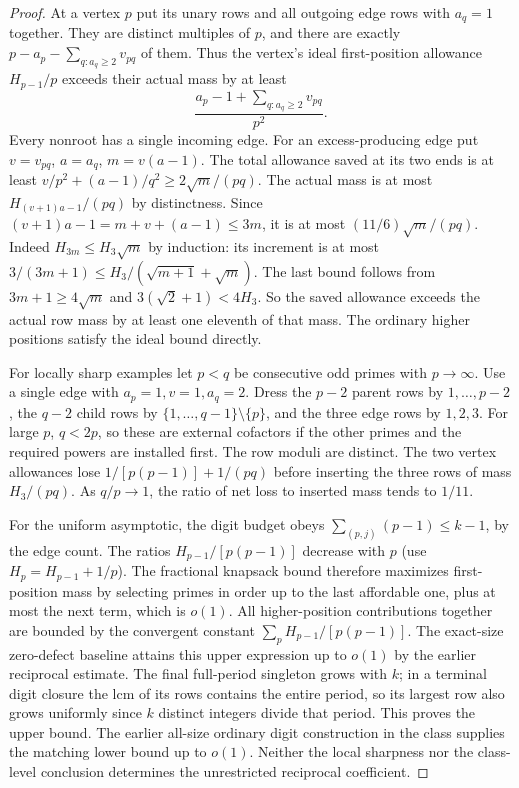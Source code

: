 \documentclass[11pt]{article}
\begin{document}
\begin{proof}
At a vertex $p$ put its unary rows and all outgoing edge rows with $a_q=1$ together. They are distinct multiples of $p$, and there are exactly $p-a_p-\sum_{q:a_q\ge2}v_{pq}$ of them. Thus the vertex's ideal first-position allowance $H_{p-1}/p$ exceeds their actual mass by at least
\[
  \frac{a_p-1+\sum_{q:a_q\ge2}v_{pq}}{p^2}.
\]
Every nonroot has a single incoming edge. For an excess-producing edge put $v=v_{pq}$, $a=a_q$, $m=v(a-1)$. The total allowance saved at its two ends is at least $v/p^2+(a-1)/q^2\ge2\sqrt m/(pq)$. The actual mass is at most $H_{(v+1)a-1}/(pq)$ by distinctness. Since $(v+1)a-1=m+v+(a-1)\le3m$, it is at most $(11/6)\sqrt m/(pq)$. Indeed $H_{3m}\le H_3\sqrt m$ by induction: its increment is at most $3/(3m+1)\le H_3/(\sqrt{m+1}+\sqrt m)$. The last bound follows from $3m+1\ge4\sqrt m$ and $3(\sqrt2+1)<4H_3$. So the saved allowance exceeds the actual row mass by at least one eleventh of that mass. The ordinary higher positions satisfy the ideal bound directly.

For locally sharp examples let $p<q$ be consecutive odd primes with $p\to\infty$. Use a single edge with $a_p=1,v=1,a_q=2$. Dress the $p-2$ parent rows by $1,\ldots,p-2$, the $q-2$ child rows by $\{1,\ldots,q-1\}\setminus\{p\}$, and the three edge rows by $1,2,3$. For large $p$, $q<2p$, so these are external cofactors if the other primes and the required powers are installed first. The row moduli are distinct. The two vertex allowances lose $1/[p(p-1)]+1/(pq)$ before inserting the three rows of mass $H_3/(pq)$. As $q/p\to1$, the ratio of net loss to inserted mass tends to $1/11$.

For the uniform asymptotic, the digit budget obeys $\sum_{(p,j)}(p-1)\le k-1$, by the edge count. The ratios $H_{p-1}/[p(p-1)]$ decrease with $p$ (use $H_p=H_{p-1}+1/p$). The fractional knapsack bound therefore maximizes first-position mass by selecting primes in order up to the last affordable one, plus at most the next term, which is $o(1)$. All higher-position contributions together are bounded by the convergent constant $\sum_p H_{p-1}/[p(p-1)]$. The exact-size zero-defect baseline attains this upper expression up to $o(1)$ by the earlier reciprocal estimate. The final full-period singleton grows with $k$; in a terminal digit closure the lcm of its rows contains the entire period, so its largest row also grows uniformly since $k$ distinct integers divide that period. This proves the upper bound. The earlier all-size ordinary digit construction in the class supplies the matching lower bound up to $o(1)$. Neither the local sharpness nor the class-level conclusion determines the unrestricted reciprocal coefficient.
\end{proof}
\end{document}
